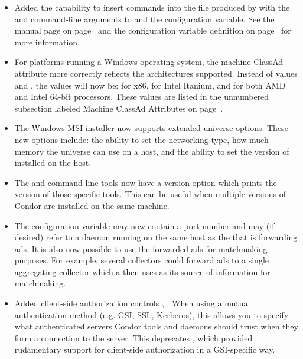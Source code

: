 \begin{itemize}

\item Added the capability to insert commands into the 
  file produced by  with the  and
   command-line arguments to  and
  the  configuration variable.
  See the  manual page on
  page~\pageref{man-condor-submit-dag}
  and the configuration variable definition on
  page~\pageref{param:DAGManInsertSubFile} for more information.

\item For platforms running a Windows operating system, the 
  machine ClassAd attribute more correctly reflects the architectures
  supported.  Instead of values  and ,
  the values will now be:  for x86,
   for Intel Itanium,
  and  for both AMD and Intel 64-bit processors.
  These values are listed in the unnumbered subsection labeled
  Machine ClassAd Attributes on page~\pageref{sec:Machine-ClassAd-Attributes}.

\item The Windows MSI installer now supports extended  universe 
  options. These new options include: the ability to set the 
  networking type, how much memory the  universe can use 
  on a host, and
  the ability to set the version of  installed on the host.

\item The  and  command line tools now have a
  version option which prints the version of those specific tools.  This
  can be useful when multiple versions of Condor are installed on the
  same machine.

\item The configuration variable  may now
  contain a port number and may (if desired) refer to a
   daemon running on the same host as the
   that is forwarding ads.  It is also now possible to
  use the forwarded ads for matchmaking purposes.  For example, several
  collectors could forward ads to a single aggregating collector which
  a  then uses as its source of information for
  matchmaking.

\item Added client-side authorization controls
, .  When using a mutual
authentication method (e.g. GSI, SSL, Kerberos), this allows you to
specify what authenticated servers Condor tools and daemons should
trust when they form a connection to the server.  This deprecates
, which provided rudamentary support for
client-side authorization in a GSI-specific way.

\end{itemize}

